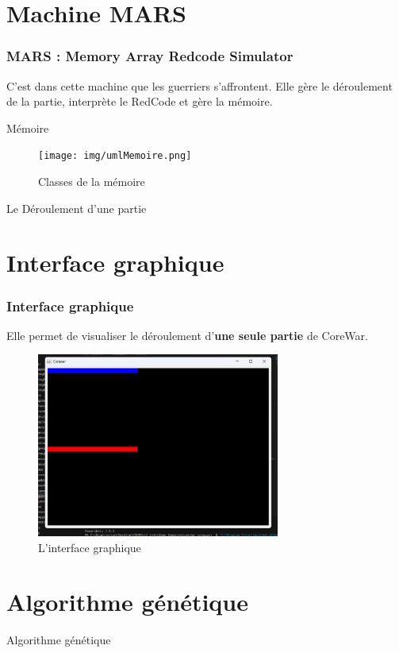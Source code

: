 \documentclass{beamer}
\begin{document}
\section{Machine MARS}
\begin{frame}
    \frametitle{MARS : Memory Array Redcode Simulator}
    C'est dans cette machine que les guerriers s'affrontent. Elle gère le déroulement de la partie, interprète le RedCode et gère la mémoire.
\end{frame}


\begin{frame}{Mémoire}
    \begin{figure}
        \centering
        \texttt{[image: img/umlMemoire.png]}
        \caption{Classes de la mémoire}
    \end{figure}
\end{frame}

\begin{frame}{Le Déroulement d'une partie}
    
\end{frame}

\section{Interface graphique}
\begin{frame}
    \frametitle{Interface graphique}
    Elle permet de visualiser le déroulement d'\textbf{une seule partie} de CoreWar.
    \begin{figure}
        \centering
        \includegraphics[width = 8cm]{img/display.jpg}
        \caption{L'interface graphique}
    \end{figure}
\vspace{-5.5pt}
\end{frame}

\section{Algorithme génétique}
\begin{frame}{Algorithme génétique}
    
\end{frame}
\end{document}
